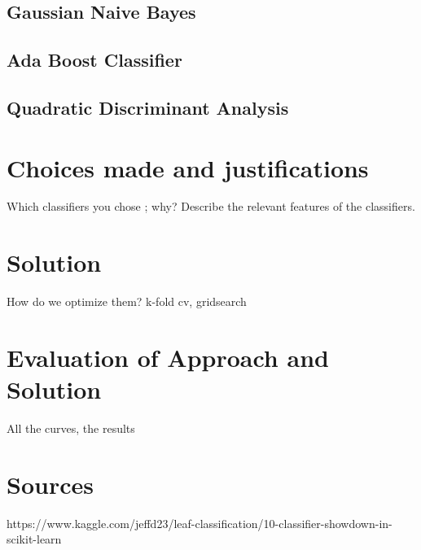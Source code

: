 \documentclass{article}
\begin{document}
\subsection{Gaussian Naive Bayes}

\subsection{Ada Boost Classifier}

\subsection{Quadratic Discriminant Analysis}

\section{Choices made and justifications}
Which classifiers you chose ; why?  
Describe the relevant features of the classifiers.

\newpage

\newpage

\section{Solution}
How do we optimize them? k-fold cv, gridsearch
\newpage

\section{Evaluation of Approach and Solution} 
All the curves, the results

\newpage

\section{Sources}


https://www.kaggle.com/jeffd23/leaf-classification/10-classifier-showdown-in-scikit-learn
\end{document}
